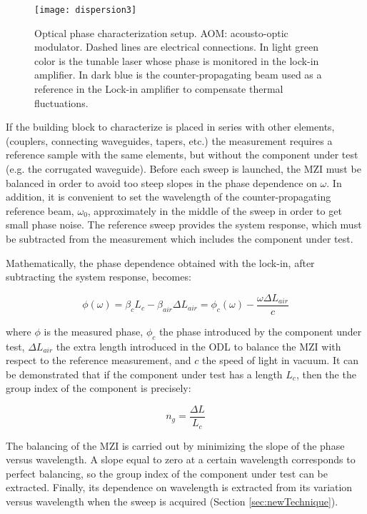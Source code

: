 \documentclass[journal]{IEEEtran}
\begin{document}
\begin{figure}[htb]
	\centering
	\texttt{[image: dispersion3]}
	\caption{Optical phase characterization setup. AOM: acousto-optic modulator. Dashed lines are electrical connections. In light green color is the tunable laser whose phase is monitored in the lock-in amplifier. In dark blue is the counter-propagating beam used as a reference in the Lock-in amplifier to compensate thermal fluctuations.}
	\label{fig:dispersionSetup}
\end{figure}


If the building block to characterize is placed in series with other elements, (couplers, connecting waveguides, tapers, etc.) the measurement requires a reference sample with the same elements, but without the component under test (e.g. the corrugated waveguide).
Before each sweep is launched, the MZI must be balanced in order to avoid too steep slopes in the phase dependence on $\omega$.
In addition, it is convenient to set the wavelength of the counter-propagating reference beam, $\omega_0$, approximately in the middle of the sweep in order to get small phase noise.
The reference sweep provides the system response, which must be subtracted from the measurement which includes the component under test. 


Mathematically, the phase dependence obtained with the lock-in, after subtracting the system response, becomes:


\begin{equation}
  \phi(\omega)= \beta_c L_c - \beta_{air} \Delta L_{air} =\phi_{c}(\omega)-\frac{\omega\Delta L_{air}}{c}
  \label{eq:response}
\end{equation}

where $\phi$ is the measured phase, $\phi_{c}$ the phase introduced by the component under test, $\Delta L_{air}$ the extra length introduced in the ODL to balance the MZI with respect to the reference measurement, and $c$ the speed of light in vacuum. It can be demonstrated \cite{Mas2012} that if the component under test has a length $L_{c}$, then the the group index of the component is precisely:

\begin{equation}
  n_{g} = \frac{\Delta L}{L_{c}}
  \label{eq:group_index_pathBalancing}
\end{equation}

The balancing of the MZI is carried out by minimizing the slope of the phase versus wavelength. A slope equal to zero at a certain wavelength corresponds to perfect balancing, so the group index of the component under test can be extracted. Finally, its dependence on wavelength is extracted from its variation versus wavelength when the sweep is acquired (Section \ref{sec:newTechnique}).
\end{document}
